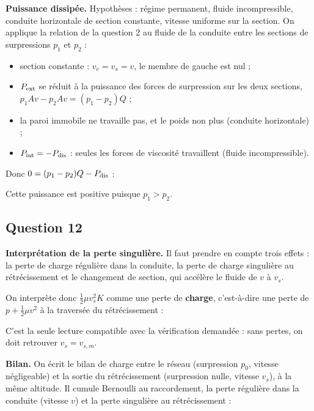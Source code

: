 \documentclass[11pt,a4paper]{article}
\providecommand{\tightlist}{\setlength{\itemsep}{0pt}\setlength{\parskip}{0pt}}
\newcommand{\equationajustee}[1]{%
  \sbox{\boiteequation}{$\displaystyle #1$}%
  \ifdim\wd\boiteequation>\linewidth
    \[\resizebox{\linewidth}{!}{\usebox{\boiteequation}}\]%
  \else
    \[#1\]%
  \fi}
\begin{document}
\textbf{Puissance dissipée.} Hypothèses : régime permanent, fluide incompressible, conduite horizontale de section constante, vitesse uniforme sur la section. On applique la relation de la question 2 au fluide de la conduite entre les sections de surpressions \(p_1\) et \(p_2\) :

\begin{itemize}
\tightlist
\item
  section constante : \(v_e=v_s=v\), le membre de gauche est nul ;
\item
  \(P_{\rm ext}\) se réduit à la puissance des forces de surpression sur les deux sections, \(p_1Av-p_2Av=(p_1-p_2)Q\) ;
\item
  la paroi immobile ne travaille pas, et le poids non plus (conduite horizontale) ;
\item
  \(P_{\rm int}=-P_{\rm dis}\) : seules les forces de viscosité travaillent (fluide incompressible).
\end{itemize}

Donc \(0=(p_1-p_2)Q-P_{\rm dis}\) :

\equationajustee{\boxed{P_{\rm dis}=Q\,(p_1-p_2)=\frac12\mu v^2\frac LD f\,Q}}

Cette puissance est positive puisque \(p_1>p_2\).

\hypertarget{question-12}{%
\subsection{Question 12}\label{question-12}}

\textbf{Interprétation de la perte singulière.} Il faut prendre en compte trois effets : la perte de charge régulière dans la conduite, la perte de charge singulière au rétrécissement et le changement de section, qui accélère le fluide de \(v\) à \(v_s\).

On interprète donc \(\tfrac12\mu v_s^2K\) comme une perte de \textbf{charge}, c'est-à-dire une perte de \(p+\tfrac12\mu v^2\) à la traversée du rétrécissement :

\equationajustee{\big(p_D+\tfrac12\mu v^2\big)-\big(p_d+\tfrac12\mu v_s^2\big)=\tfrac12\mu v_s^2K.}

C'est la seule lecture compatible avec la vérification demandée : sans pertes, on doit retrouver \(v_s=v_{s,m}\).

\textbf{Bilan.} On écrit le bilan de charge entre le réseau (surpression \(p_0\), vitesse négligeable) et la sortie du rétrécissement (surpression nulle, vitesse \(v_s\)), à la même altitude. Il cumule Bernoulli au raccordement, la perte régulière dans la conduite (vitesse \(v\)) et la perte singulière au rétrécissement :
\end{document}
